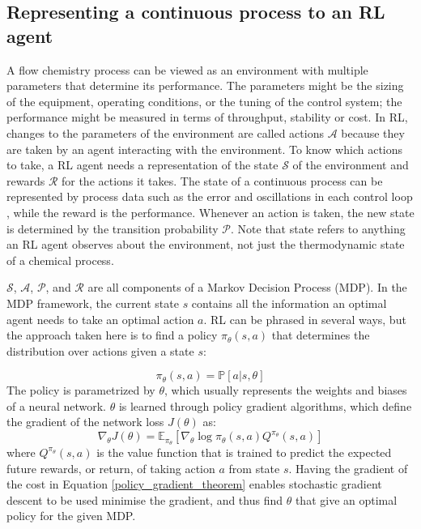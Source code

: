 \subsection{Representing a continuous process to an RL agent}
A flow chemistry process can be viewed as an environment with multiple parameters that determine its performance. The parameters might be the sizing of the equipment, operating conditions, or the tuning of the control system; the performance might be measured in terms of throughput, stability or cost. In RL, changes to the parameters of the environment are called actions $\mathcal A$ because they are taken by an agent interacting with the environment. To know which actions to take, a RL agent needs a representation of the state $\mathcal S$ of the environment and rewards $\mathcal R$ for the actions it takes. The state of a continuous process can be represented by process data such as the error and oscillations in each control loop \cite{Lee2005, Badgwell2019, Shin2019}, while the reward is the performance. Whenever an action is taken, the new state is determined by the transition probability $\mathcal P$. Note that state refers to anything an RL agent observes about the environment, not just the thermodynamic state of a chemical process.

$\mathcal S$, $\mathcal A$, $\mathcal P$, and $\mathcal R$ are all components of a Markov Decision Process (MDP). In the MDP framework, the current state $s$ contains all the information an optimal agent needs to take an optimal action $a$.  RL can be phrased in several ways, but the approach taken here is to find a policy $\pi_{\theta}(s,a)$ that determines the distribution over actions given a state $s$:

\begin{equation}
	\pi_{\theta}(s,a) = \mathbb P[a|s,\theta]
\end{equation}
The policy is parametrized by $\theta$, which usually represents the weights and biases of a neural network. $\theta$ is learned through policy gradient algorithms, which define the gradient of the network loss $J(\theta)$ as:
\begin{equation}
	\label{policy_gradient_theorem}
	\nabla_{\theta}J(\theta) = \mathbb E_{\pi_{\theta}} [\nabla_{\theta} \log \pi_\theta(s,a)Q^{\pi_{\theta}}(s,a)]
\end{equation}
where $Q^{\pi_{\theta}}(s,a)$ is the value function that is trained to predict the expected future rewards, or return, of taking action $a$ from state $s$. Having the gradient of the cost in Equation \ref{policy_gradient_theorem} enables stochastic gradient descent to be used minimise the gradient, and thus find $\theta$ that give an optimal policy for the given MDP.

